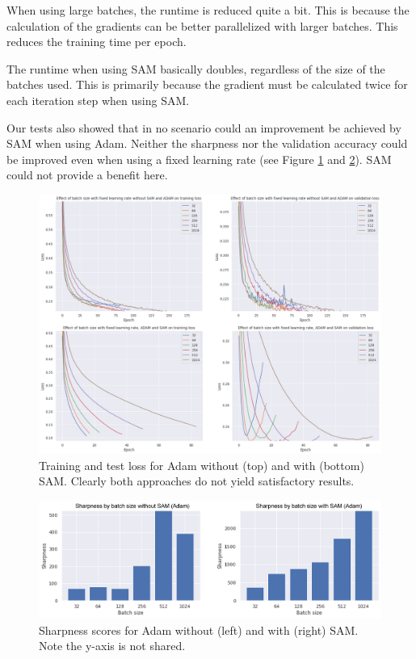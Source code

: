 \documentclass[10pt,conference,compsocconf]{IEEEtran}
\begin{document}
When using large batches, the runtime is reduced quite a bit. This is because the calculation of the gradients can be better parallelized with larger batches. This reduces the training time per epoch.

The runtime when using SAM basically doubles, regardless of the size of the batches used. This is primarily because the gradient must be calculated twice for each iteration step when using SAM.

Our tests also showed that in no scenario could an improvement be achieved by SAM when using Adam. Neither the sharpness nor the validation accuracy could be improved even when using a fixed learning rate (see Figure \ref{fig:adam-val-loss-with-without} and \ref{fig:adam-sharpness-with-without}). SAM could not provide a benefit here.

\begin{figure}[tbp]
  \centering
  \includegraphics[width=\columnwidth]{img/figure3_val_loss_with_without_sam_adam}
  \caption{Training and test loss for Adam without (top) and with (bottom) SAM. Clearly both approaches do not yield satisfactory results.}
  \vspace{-3mm}
  \label{fig:adam-val-loss-with-without}
\end{figure}
\begin{figure}[tbp]
  \centering
  \includegraphics[width=\columnwidth]{img/figure4_sharpness_with_without_sam_adam}
  \caption{Sharpness scores for Adam without (left) and with (right) SAM. Note the y-axis is not shared.}
  \vspace{-3mm}
  \label{fig:adam-sharpness-with-without}
\end{figure}
\end{document}
